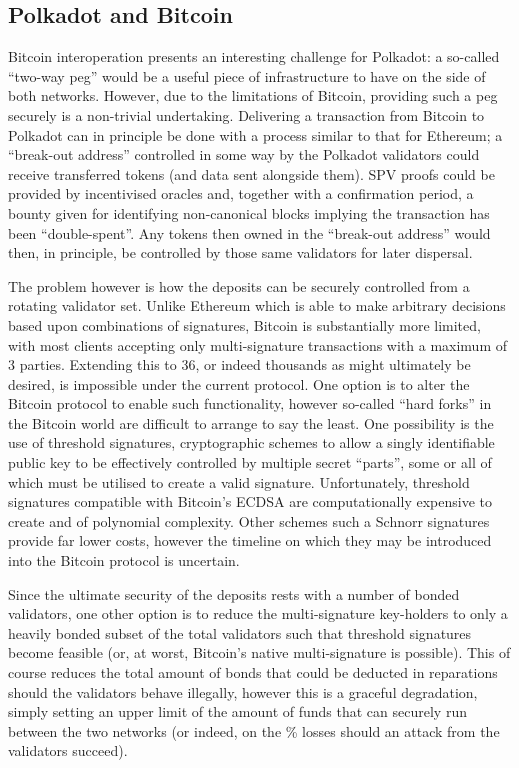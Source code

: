 \documentclass[9pt,oneside]{amsart}
\begin{document}
\begin{multicols}{2}
\subsection{Polkadot and Bitcoin}\label{disparity-and-bitcoin}

 Bitcoin interoperation presents an interesting challenge for Polkadot: a so-called ``two-way peg'' would be a useful piece of infrastructure to have on the side of both networks. However, due to the limitations of Bitcoin, providing such a peg securely is a non-trivial undertaking. Delivering a transaction from Bitcoin to Polkadot can in principle be done with a process similar to that for Ethereum; a ``break-out address'' controlled in some way by the Polkadot validators could receive transferred tokens (and data sent alongside them). SPV proofs could be provided by incentivised oracles and, together with a confirmation period, a bounty given for identifying non-canonical blocks implying the transaction has been ``double-spent''. Any tokens then owned in the ``break-out address'' would then, in principle, be controlled by those same validators for later dispersal.

 The problem however is how the deposits can be securely controlled from a rotating validator set. Unlike Ethereum which is able to make arbitrary decisions based upon combinations of signatures, Bitcoin is substantially more limited, with most clients accepting only multi-signature transactions with a maximum of 3 parties. Extending this to 36, or indeed thousands as might ultimately be desired, is impossible under the current protocol. One option is to alter the Bitcoin protocol to enable such functionality, however so-called ``hard forks'' in the Bitcoin world are difficult to arrange to say the least. One possibility is the use of threshold signatures, cryptographic schemes to allow a singly identifiable public key to be effectively controlled by multiple secret ``parts'', some or all of which must be utilised to create a valid signature. Unfortunately, threshold signatures compatible with Bitcoin's ECDSA are computationally expensive to create and of polynomial complexity. Other schemes such a Schnorr signatures provide far lower costs, however the timeline on which they may be introduced into the Bitcoin protocol is uncertain.

 Since the ultimate security of the deposits rests with a number of bonded validators, one other option is to reduce the multi-signature key-holders to only a heavily bonded subset of the total validators such that threshold signatures become feasible (or, at worst, Bitcoin's native multi-signature is possible). This of course reduces the total amount of bonds that could be deducted in reparations should the validators behave illegally, however this is a graceful degradation, simply setting an upper limit of the amount of funds that can securely run between the two networks (or indeed, on the \% losses should an attack from the validators succeed).


\end{multicols}
\end{document}

